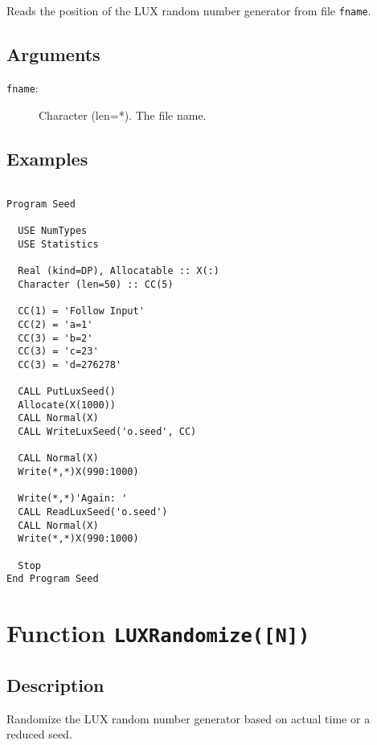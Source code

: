 Reads the position of the LUX random number generator from file
\texttt{fname}.

\subsection{Arguments}

\begin{description}
\item[\texttt{fname}:] Character (len=*). The file name.
\end{description}

\subsection{Examples}

\begin{lstlisting}[emph=ReadLuxSeed,
                   emphstyle=\color{blue},
                   frame=trBL,
                   caption=Using a previously saved point in the generating process.,
                   label=readluxseed]

Program Seed

  USE NumTypes
  USE Statistics

  Real (kind=DP), Allocatable :: X(:)
  Character (len=50) :: CC(5)

  CC(1) = 'Follow Input'
  CC(2) = 'a=1'
  CC(3) = 'b=2'
  CC(3) = 'c=23'
  CC(3) = 'd=276278'

  CALL PutLuxSeed()
  Allocate(X(1000))
  CALL Normal(X)
  CALL WriteLuxSeed('o.seed', CC)

  CALL Normal(X)
  Write(*,*)X(990:1000)

  Write(*,*)'Again: '
  CALL ReadLuxSeed('o.seed')
  CALL Normal(X)
  Write(*,*)X(990:1000)

  Stop
End Program Seed
\end{lstlisting}

\section{Function \texttt{LUXRandomize([N])}}

\subsection{Description}

Randomize the LUX random number generator based on actual time or a
reduced seed. 


